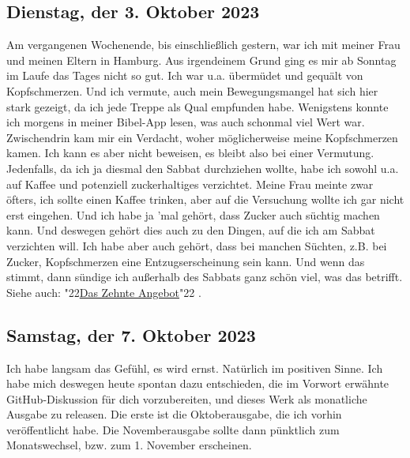 \documentclass[12pt,a5paper]{article}
\newcommand{\q}[1]{\char"22{#1}\char"22 }
\begin{document}
	\subsection{Dienstag, der 3. Oktober 2023}
		Am vergangenen Wochenende,
		bis einschlie{\ss}lich gestern,
		war ich mit meiner Frau und meinen Eltern in Hamburg.
		Aus irgendeinem Grund ging es mir ab Sonntag im Laufe das Tages nicht so gut.
		Ich war u.a. \"uberm\"udet und gequ\"alt von Kopfschmerzen.
		Und ich vermute,
		auch mein Bewegungsmangel hat sich hier stark gezeigt,
		da ich jede Treppe als Qual empfunden habe.
		Wenigstens konnte ich morgens in meiner Bibel-App lesen,
		was auch schonmal viel Wert war.
		Zwischendrin kam mir ein Verdacht,
		woher m\"oglicherweise meine Kopfschmerzen kamen.
		Ich kann es aber nicht beweisen,
		es bleibt also bei einer Vermutung.
		Jedenfalls,
		da ich ja diesmal den Sabbat durchziehen wollte,
		habe ich sowohl u.a. auf Kaffee und potenziell zuckerhaltiges verzichtet.
		Meine Frau meinte zwar \"ofters,
		ich sollte einen Kaffee trinken,
		aber auf die Versuchung wollte ich gar nicht erst eingehen.
		Und ich habe ja 'mal geh\"ort,
		dass Zucker auch s\"uchtig machen kann.
		Und deswegen geh\"ort dies auch zu den Dingen,
		auf die ich am Sabbat verzichten will.
		Ich habe aber auch geh\"ort,
		dass bei manchen S\"uchten,
		z.B. bei Zucker,
		Kopfschmerzen eine Entzugserscheinung sein kann.
		Und wenn das stimmt,
		dann s\"undige ich au{\ss}erhalb des Sabbats ganz sch\"on viel,
		was das betrifft.
		Siehe auch: \q{\hyperref[DasZehnteAngebot]{Das Zehnte Angebot}}.
		
	\subsection{Samstag, der 7. Oktober 2023}
		Ich habe langsam das Gef\"uhl,
		es wird ernst.
		Nat\"urlich im positiven Sinne.
		Ich habe mich deswegen heute spontan dazu entschieden,
		die im Vorwort erw\"ahnte GitHub-Diskussion f\"ur dich vorzubereiten,
		und dieses Werk als monatliche Ausgabe zu releasen.
		Die erste ist die Oktoberausgabe,
		die ich vorhin ver\"offentlicht habe.
		Die Novemberausgabe sollte dann p\"unktlich zum Monatswechsel,
		bzw. zum 1. November erscheinen.
	
\end{document}
